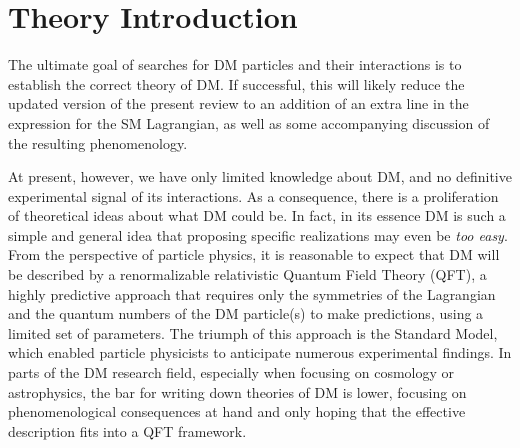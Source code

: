 \chapter*{Theory Introduction}
The ultimate goal of searches for DM particles and their interactions is to establish the correct theory of DM. If successful, this will likely reduce the updated version of the present review to an addition of an extra line in the expression for the  SM Lagrangian, as well as some accompanying discussion of the resulting phenomenology.

At present, however, we have only limited knowledge about DM, and no definitive experimental signal of its interactions. 
As a consequence, there is a proliferation of theoretical ideas about what DM could be.
In fact, in its essence DM is such a simple and general idea that 
proposing specific realizations may even be {\em too easy}. 
From the perspective of particle physics, it is reasonable to expect that DM will be described by a renormalizable relativistic Quantum Field Theory (QFT), a highly predictive approach that requires only the symmetries of the Lagrangian and the quantum numbers of the DM particle(s) to make predictions, using a limited set of parameters. 
The triumph of this approach is the Standard Model,
which enabled particle physicists to anticipate numerous experimental findings.
In parts of the DM research field, especially when focusing on cosmology or astrophysics, the bar for writing down theories of DM is lower, focusing on phenomenological consequences at hand and only hoping that the effective description fits into a QFT framework. 

